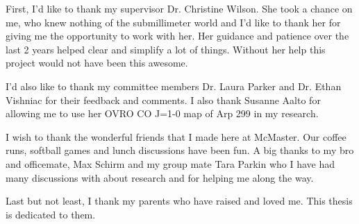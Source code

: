 
\newcommand{\firstname}{Kazimierz}
\newcommand{\middlename}{}
\newcommand{\lastname}{Sliwa}
\newcommand{\degrees}{B.Sc.}
\newcommand{\thetitle}{SMA Observations of the Local Galaxy Merger Arp 299}
\newcommand{\halftitle}{SMA Observations of  Arp 299}
\newcommand{\thedegree}{Master of Science}
\newcommand{\shortdegree}{M.Sc.}
\newcommand{\currentmonth}{August}
\newcommand{\currentyear}{2011}
\newcommand{\department}{Physics and Astronomy}
\newcommand{\shortdepartment}{Physics and Astronomy}
\newcommand{\theuniversity}{McMaster University}
\newcommand{\bindingyear}{2011}
\newcommand{\submissionyear}{2011}
\newcommand{\submissionmonth}{August}
\newcommand{\supervisor}{Christine D. Wilson}
\newcommand{\thelocation}{Hamilton, Ontario}
\newcommand{\degreefrom}{University of Toronto}


\newcommand{\firstpages}{\pageref{frontmatterpages}}
\newcommand{\lastpages}{\pageref{finalpage}}


\halftitlepage
\thesistitle
\descriptivenotes

\begin{abstract} 



\end{abstract}




\dedication{To my parents}
\begin{acknowledgement}

First, I'd like to thank my supervisor Dr. Christine Wilson. She took a chance on me, who knew nothing of the submillimeter world and I'd like to thank her for giving me the opportunity to work with her.  Her guidance and patience over the last 2 years helped clear and simplify a lot of things. Without her help this project would not have been this awesome. 

I'd also like to thank my committee members Dr. Laura Parker and Dr. Ethan Vishniac for their feedback and comments. I also thank Susanne Aalto for allowing me to use her OVRO CO J=1-0 map of Arp 299 in my research. 

I wish to thank the wonderful friends that I made here at McMaster.  Our coffee runs, softball games and lunch discussions have been fun. A big thanks to my bro and officemate, Max Schirm and my group mate Tara Parkin who I have had many discussions with about research and for helping me along the way. 

Last but not least, I thank my parents who have raised and loved me. This thesis is dedicated to them.
\end{acknowledgement}

\tableofcontents
\listoffigures
\listoftables
